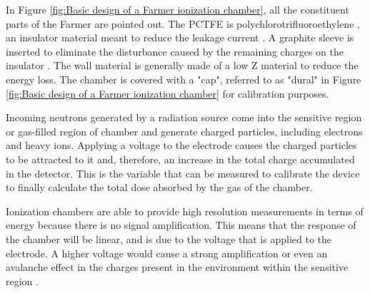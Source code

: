 In Figure \ref{fig:Basic design of a Farmer ionization chamber}, all the constituent parts of the Farmer are pointed out. The PCTFE is polychlorotrifluoroethylene \cite{DesignOfThimbleChamber}, an insulator material meant to reduce the leakage current \cite{RadiationOncologyInPhysicsHandbook}. A graphite sleeve is inserted to eliminate the disturbance caused by the remaining charges on the insulator \cite{DesignOfThimbleChamber}. The wall material is generally made of a low Z material to reduce the energy loss. The chamber is covered with a "cap", referred to as "dural" in Figure \ref{fig:Basic design of a Farmer ionization chamber} for calibration purposes. 

Incoming neutrons generated by a radiation source come into the sensitive region or gas-filled region of chamber and generate charged particles, including electrons and heavy ions. Applying a voltage to the electrode causes the charged particles to be attracted to it and, therefore, an increase in the total charge accumulated in the detector. This is the variable that can be measured to calibrate the device to finally calculate the total dose absorbed by the gas of the chamber.

Ionization chambers are able to provide high resolution measurements in terms of energy because there is no signal amplification. This means that the response of the chamber will be linear, and is due to the voltage that is applied to the electrode. A higher voltage would cause a strong amplification or even an avalanche effect in the charges present in the environment within the sensitive region \cite{IntroToNuclearAndParticle}.